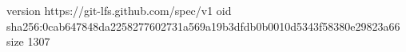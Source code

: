 version https://git-lfs.github.com/spec/v1
oid sha256:0cab647848da2258277602731a569a19b3dfdb0b0010d5343f58380e29823a66
size 1307
